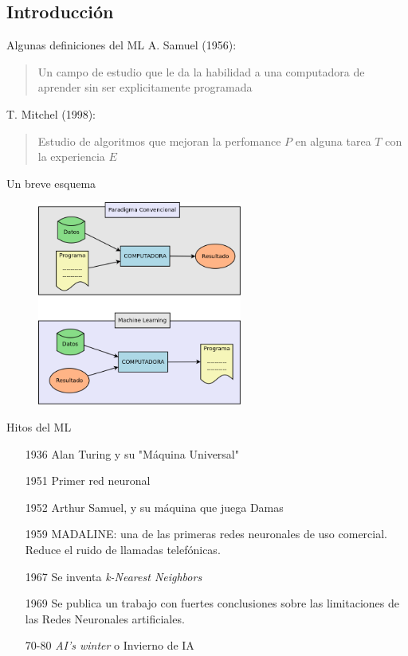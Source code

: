 \documentclass[11pt]{beamer}
\begin{document}
\subsection{Introducci\'on}
\begin{frame}{Algunas definiciones del ML}
    A. Samuel (1956):
    \begin{quote}
        Un campo de estudio que le da la habilidad a una computadora de aprender sin ser explicitamente programada
    \end{quote}
    \pause
    T. Mitchel (1998):
    \begin{quote}
        Estudio de algoritmos que mejoran la perfomance $P$ en alguna tarea $T$ con la experiencia $E$
    \end{quote}
\end{frame}
\begin{frame}{Un breve esquema}
    \begin{figure}
        \centering
        \includegraphics[width=0.6\textwidth]{images/ML_vs_programming.png}
        \label{fig:ML_vs_conventional}
    \end{figure}
\end{frame}
\begin{frame}{Hitos del ML}
\begin{itemize}
    \item[1936] Alan Turing y su "M\'aquina Universal"
    \item[1951] Primer red neuronal
    \item[1952] Arthur Samuel, y su m\'aquina que juega Damas
    \item[1959] MADALINE: una de las primeras redes neuronales de uso comercial. Reduce el ruido de llamadas telef\'onicas.
    \item[1967] Se inventa \textit{k-Nearest Neighbors}
    \item[1969] Se publica un trabajo con fuertes conclusiones sobre las limitaciones de las Redes Neuronales artificiales.
    \item[70-80] \textit{AI's winter} o Invierno de IA
\end{itemize}
\end{frame}
\end{document}
